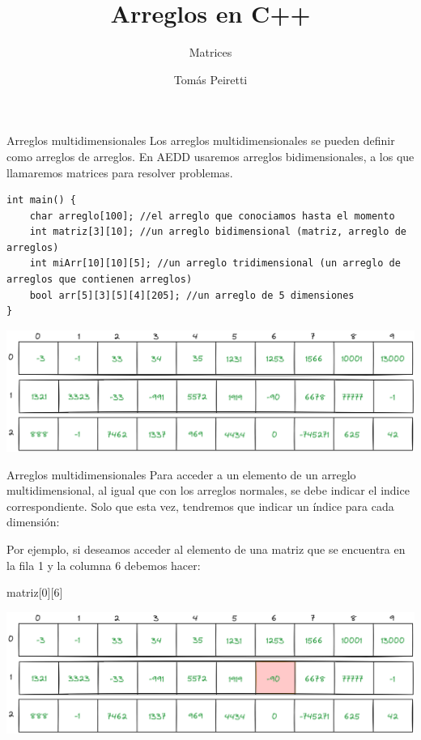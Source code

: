 \documentclass[12pt]{beamer}
\title{Arreglos en C++}
\subtitle{Matrices}
\author{Tomás Peiretti}
\date{}
\begin{document}
\maketitle

\begin{frame}[fragile]{Arreglos multidimensionales}
    Los arreglos multidimensionales se pueden definir como \alert{arreglos de arreglos}. En AEDD usaremos arreglos bidimensionales, a los que llamaremos \alert{matrices} para resolver problemas.

    \smallskip

\begin{lstlisting}[basicstyle=\tiny]
int main() {
    char arreglo[100]; //el arreglo que conociamos hasta el momento
    int matriz[3][10]; //un arreglo bidimensional (matriz, arreglo de arreglos)
    int miArr[10][10][5]; //un arreglo tridimensional (un arreglo de arreglos que contienen arreglos)
    bool arr[5][3][5][4][205]; //un arreglo de 5 dimensiones
}
\end{lstlisting}
    \includegraphics[width=\textwidth]{matriz.png}
\end{frame}

\begin{frame}{Arreglos multidimensionales}
    Para \alert{acceder a un elemento} de un arreglo multidimensional, al igual que con los arreglos normales, se debe indicar el indice correspondiente. Solo que esta vez, tendremos que \alert{indicar un índice para cada dimensión}:
    
    \smallskip
    
    Por ejemplo, si deseamos acceder al elemento de una matriz que se encuentra en la fila 1 y la columna 6 debemos hacer:
    \begin{center}
        matriz[\alert{0}][\alert{6}]
    \end{center}
    \includegraphics[width=\textwidth]{matriz_1_6.png}
\end{frame}
\end{document}
